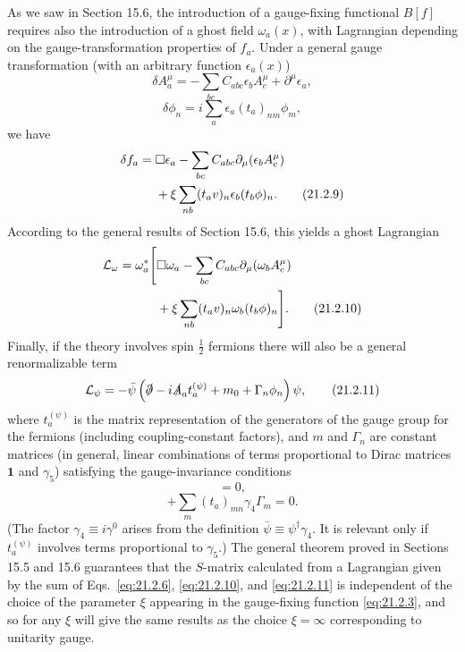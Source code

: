 As we saw in Section 15.6, the introduction of a gauge-fixing functional
$B[f]$ requires also the introduction of a ghost field $\omega_a(x)$,
with Lagrangian depending on the gauge-transformation properties of
$f_a$. Under a general gauge transformation (with an arbitrary
function $\epsilon_a(x)$)
\begin{equation}
 \delta A_a^\mu
 =-\sum_{bc}C_{abc}
 \epsilon_b A_c^\mu+\partial^\mu\epsilon_a,
 \tag{21.2.7}\label{eq:21.2.7}
\end{equation}
\begin{equation}
 \delta\phi_n=i\sum_a
 \epsilon_a(t_a)_{nm}\phi_m,
 \tag{21.2.8}\label{eq:21.2.8}
\end{equation}
we have
\begin{align}
 \delta f_a={}&\Box\epsilon_a
 -\sum_{bc}C_{abc}
 \partial_\mu(\epsilon_b A_c^\mu)
 \notag\\
 &+\xi\sum_{nb}(t_a v)_n
 \epsilon_b(t_b\phi)_n.
 \tag{21.2.9}\label{eq:21.2.9}
\end{align}
According to the general results of Section 15.6, this yields a ghost
Lagrangian
\begin{align}
 \mathcal L_\omega=\omega_a^*\Bigg[
 &\Box\omega_a
 -\sum_{bc}C_{abc}
 \partial_\mu(\omega_b A_c^\mu)
 \notag\\
 &+\xi\sum_{nb}(t_a v)_n
 \omega_b(t_b\phi)_n\Bigg].
 \tag{21.2.10}\label{eq:21.2.10}
\end{align}
Finally, if the theory involves spin $\frac12$ fermions there will also be a
general renormalizable term
\begin{equation}
 \mathcal L_\psi
 =-\bar\psi\left(
 \sl{\partial}-i\sl{A}_a t_a^{(\psi)}
 +m_0+\Gamma_n\phi_n\right)\psi,
 \tag{21.2.11}\label{eq:21.2.11}
\end{equation}
where $t_a^{(\psi)}$ is the matrix representation of the generators of
the gauge group for the fermions (including coupling-constant factors), and
$m$ and $\Gamma_n$ are constant matrices (in general, linear combinations
of terms proportional to Dirac matrices $\mathbf{1}$ and $\gamma_5$)
satisfying the gauge-invariance conditions
\begin{equation}
 [t_a^{(\psi)},\gamma_4m_0]=0,
 \tag{21.2.12}\label{eq:21.2.12}
\end{equation}
\begin{equation}
 [t_a^{(\psi)},\gamma_4\Gamma_n]
 +\sum_m(t_a)_{mn}\gamma_4\Gamma_m=0.
 \tag{21.2.13}\label{eq:21.2.13}
\end{equation}
(The factor $\gamma_4\equiv i\gamma^0$ arises from the definition
$\bar\psi\equiv\psi^\dagger\gamma_4$. It is relevant only if
$t_a^{(\psi)}$ involves terms proportional to $\gamma_5$.) The general
theorem proved in Sections 15.5 and 15.6 guarantees that the $S$-matrix
calculated from a Lagrangian given by the sum of Eqs.~\eqref{eq:21.2.6},
\eqref{eq:21.2.10}, and \eqref{eq:21.2.11} is independent of the choice of
the parameter $\xi$ appearing in the gauge-fixing function
\eqref{eq:21.2.3}, and so for any $\xi$ will give the same results as the
choice $\xi=\infty$ corresponding to unitarity gauge.

